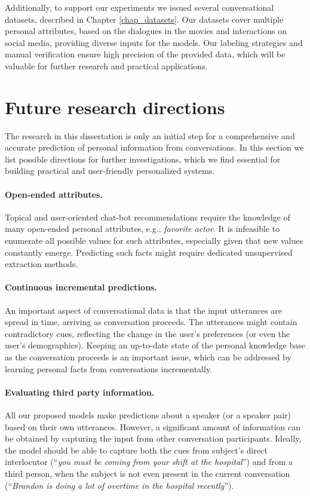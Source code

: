 Additionally, to support our experiments we issued several conversational datasets, described in Chapter \ref{chap_datasets}. Our datasets cover multiple personal attributes, based on the dialogues in the movies and interactions on social media, providing diverse inputs for the models. Our labeling strategies and manual verification ensure high precision of the provided data, which will be valuable for further research and practical applications.

\section{Future research directions}

The research in this dissertation is only an initial step for a comprehensive and accurate prediction of personal information from conversations. In this section we list possible directions for further investigations, which we find essential for building practical and user-friendly personalized systems.

\paragraph{Open-ended attributes.} Topical and user-oriented chat-bot recommendations require the knowledge of many open-ended personal attributes, e.g., \textit{favorite actor}. It is infeasible to enumerate all possible values for such attributes, especially given that new values constantly emerge. Predicting such facts might require dedicated unsupervised extraction methods.

\paragraph{Continuous incremental predictions.} An important aspect of conversational data is that the input utterances are spread in time, arriving as conversation proceeds. The utterances might contain contradictory cues, reflecting the change in the user's preferences (or even the user's demographics). Keeping an up-to-date state of the personal knowledge base as the conversation proceeds is an important issue, which can be addressed by learning personal facts from conversations incrementally.

\paragraph{Evaluating third party information.} All our proposed models make predictions about a speaker (or a speaker pair) based on their own utterances. However, a significant amount of information can be obtained by capturing the input from other conversation participants. Ideally, the model should be able to capture both the cues from subject's direct  interlocutor (``\textit{you must be coming from your shift at the hospital}'') and from a third person, when the subject is not even present in the current conversation (``\textit{Brandon is doing a lot of overtime in the hospital recently}''). 

